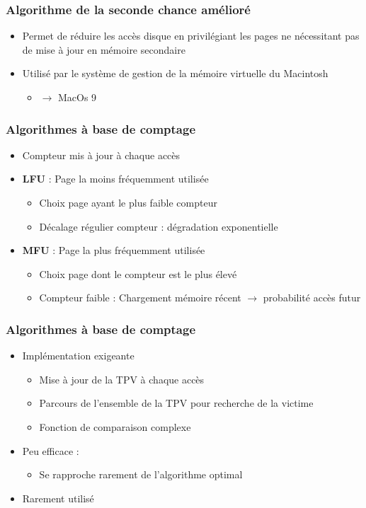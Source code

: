 \begin{frame}
\frametitle{Algorithme de la seconde chance amélioré}
\begin{itemize}
\item Permet de réduire les accès disque en privilégiant les pages ne nécessitant pas de mise à jour en mémoire secondaire
\item Utilisé par le système de gestion de la mémoire virtuelle du Macintosh
\begin{itemize}
\item $\rightarrow$ MacOs 9
\end{itemize}
\end{itemize}
\end{frame}


\begin{frame}
\frametitle{Algorithmes à base de comptage}
\begin{itemize}
\item Compteur mis à jour à chaque accès
\item \textbf{LFU} : Page la moins fréquemment utilisée
\begin{itemize}
\item Choix page ayant le plus faible compteur
\item Décalage régulier compteur : dégradation exponentielle
\end{itemize}
\item \textbf{MFU} : Page la plus fréquemment utilisée
\begin{itemize}
\item Choix page dont le compteur est le plus élevé
\item Compteur faible : Chargement mémoire récent $\rightarrow$ probabilité accès futur
\end{itemize}
\end{itemize}
\end{frame}


\begin{frame}
\frametitle{Algorithmes à base de comptage}
\begin{itemize}
\item Implémentation exigeante
\begin{itemize}
\item Mise à jour de la TPV à chaque accès
\item Parcours de l'ensemble de la TPV pour recherche de la victime
\item Fonction de comparaison complexe
\end{itemize}
\item Peu efficace :
\begin{itemize}
\item Se rapproche rarement de l’algorithme optimal
\end{itemize}
\item Rarement utilisé
\end{itemize}
\end{frame}


